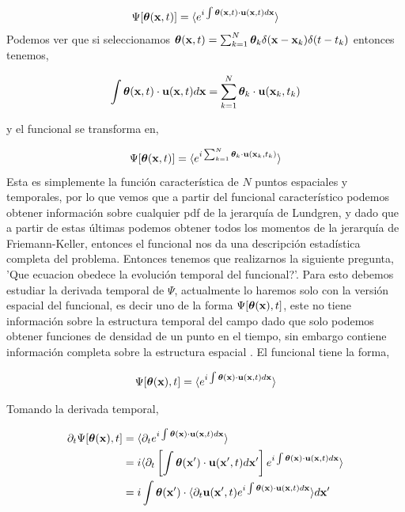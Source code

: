 \documentclass[executivepaper,12pt]{article}
\numberwithin{equation}{section}
\begin{document}
\begin{equation*}
	\Psi[\bm{\theta}(\vb{x},t)]=\langle e^{i\int \bm{\theta}(\vb{x},t)\cdot\vb{u}(\vb{x},t) d\vb{x}} \rangle
\end{equation*}
Podemos ver que si seleccionamos $\bm{\theta}(\vb{x},t)=\sum_{k=1}^N \bm{\theta}_k \delta(\vb{x}-\vb{x}_k)\delta(t-t_k)$ entonces tenemos,

\begin{equation}
	\int \bm{\theta}(\vb{x},t)\cdot\vb{u}(\vb{x},t) d\vb{x}=\sum_{k=1}^N \bm{\theta}_k \cdot \vb{u}(\vb{x}_k,t_k)
\end{equation}

y el funcional se transforma en,

\begin{equation*}
	\Psi[\bm{\theta}(\vb{x},t)]=\langle e^{i\sum_{k=1}^N \bm{\theta}_k \cdot \vb{u}(\vb{x}_k,t_k)}\rangle
\end{equation*}
Esta es simplemente la función característica de $N$ puntos espaciales y temporales, por lo que vemos que a partir del funcional característico podemos obtener información sobre cualquier pdf de la jerarquía de Lundgren, y dado que a partir de estas últimas podemos obtener todos los momentos de la jerarquía de Friemann-Keller, entonces el funcional nos da una descripción estadística completa del problema. Entonces tenemos que realizarnos la siguiente pregunta, 'Que ecuacion obedece la evolución temporal del funcional?'. Para esto debemos estudiar la derivada temporal de $\Psi$, actualmente lo haremos solo con la versión espacial del funcional, es decir uno de la forma $\Psi[\bm{\theta}(\vb{x}),t]$, este no tiene información sobre la estructura temporal del campo dado que solo podemos obtener funciones de densidad de un punto en el tiempo, sin embargo contiene información completa sobre la estructura espacial \parencite{monin1976}. El funcional tiene la forma,

\begin{equation*}
	\Psi[\bm{\theta}(\vb{x}),t]=\langle e^{i\int \bm{\theta}(\vb{x})\cdot\vb{u}(\vb{x},t) d\vb{x}} \rangle
\end{equation*}

Tomando la derivada temporal,

\begin{align*}
	\partial_t\Psi[\bm{\theta}(\vb{x}),t]&=\langle \partial_t e^{i\int \bm{\theta}(\vb{x})\cdot\vb{u}(\vb{x},t) d\vb{x}} \rangle\\
	&=i\langle \partial_t\left[\int \bm{\theta}(\vb{x}')\cdot\vb{u}(\vb{x}',t) d\vb{x}'\right] e^{i\int \bm{\theta}(\vb{x})\cdot\vb{u}(\vb{x},t) d\vb{x}} \rangle\\
	&=i\int \bm{\theta}(\vb{x}')\cdot\langle \partial_t \vb{u}(\vb{x}',t)e^{i\int \bm{\theta}(\vb{x})\cdot\vb{u}(\vb{x},t) d\vb{x}} \rangle d\vb{x}'\\
\end{align*}
\end{document}
